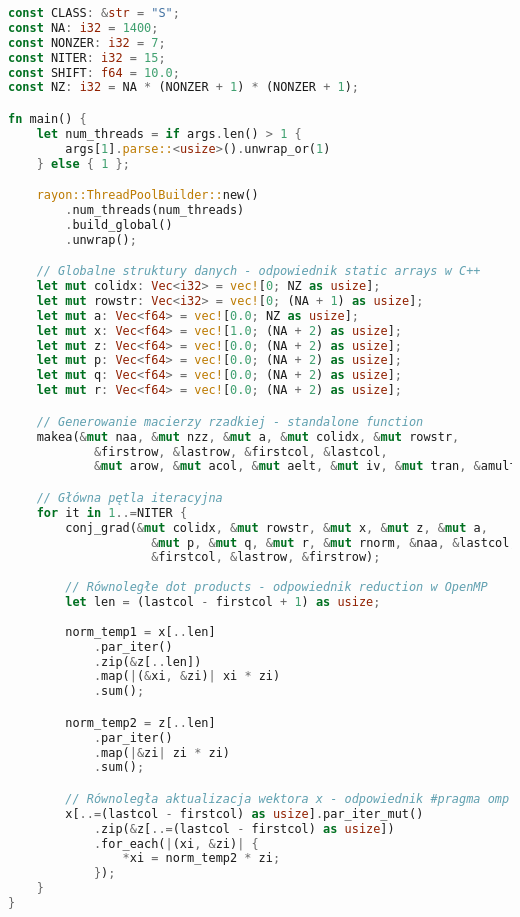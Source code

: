 \begin{lstlisting}[language=Rust, caption={Implementacja benchmarku CG w języku Rust}, label={lst:cg_rust}]
const CLASS: &str = "S";
const NA: i32 = 1400;
const NONZER: i32 = 7;
const NITER: i32 = 15;
const SHIFT: f64 = 10.0;
const NZ: i32 = NA * (NONZER + 1) * (NONZER + 1);

fn main() {
    let num_threads = if args.len() > 1 {
        args[1].parse::<usize>().unwrap_or(1)
    } else { 1 };

    rayon::ThreadPoolBuilder::new()
        .num_threads(num_threads)
        .build_global()
        .unwrap();

    // Globalne struktury danych - odpowiednik static arrays w C++
    let mut colidx: Vec<i32> = vec![0; NZ as usize];
    let mut rowstr: Vec<i32> = vec![0; (NA + 1) as usize];
    let mut a: Vec<f64> = vec![0.0; NZ as usize];
    let mut x: Vec<f64> = vec![1.0; (NA + 2) as usize];
    let mut z: Vec<f64> = vec![0.0; (NA + 2) as usize];
    let mut p: Vec<f64> = vec![0.0; (NA + 2) as usize];
    let mut q: Vec<f64> = vec![0.0; (NA + 2) as usize];
    let mut r: Vec<f64> = vec![0.0; (NA + 2) as usize];

    // Generowanie macierzy rzadkiej - standalone function
    makea(&mut naa, &mut nzz, &mut a, &mut colidx, &mut rowstr, 
            &firstrow, &lastrow, &firstcol, &lastcol, 
            &mut arow, &mut acol, &mut aelt, &mut iv, &mut tran, &amult);

    // Główna pętla iteracyjna
    for it in 1..=NITER {
        conj_grad(&mut colidx, &mut rowstr, &mut x, &mut z, &mut a, 
                    &mut p, &mut q, &mut r, &mut rnorm, &naa, &lastcol, 
                    &firstcol, &lastrow, &firstrow);
        
        // Równoległe dot products - odpowiednik reduction w OpenMP
        let len = (lastcol - firstcol + 1) as usize;
        
        norm_temp1 = x[..len]
            .par_iter()
            .zip(&z[..len])
            .map(|(&xi, &zi)| xi * zi)
            .sum();

        norm_temp2 = z[..len]
            .par_iter()
            .map(|&zi| zi * zi)
            .sum();

        // Równoległa aktualizacja wektora x - odpowiednik #pragma omp for
        x[..=(lastcol - firstcol) as usize].par_iter_mut()
            .zip(&z[..=(lastcol - firstcol) as usize])
            .for_each(|(xi, &zi)| {
                *xi = norm_temp2 * zi;
            });
    }
}


\end{lstlisting}
